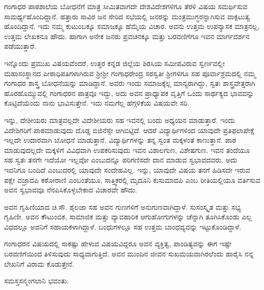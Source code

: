 {ಗಂಗಾಧರ ಪಾಠಶಾಲೆಯ ಬೋಧನೆಗೆ ಮಾತ್ರ ಸೀಮಿತವಾಗದೇ ದೇಶವಿದೇಶ\-ಗಳಿಗೂ ತೆರಳಿ ವಿಷಯ ಸಮರ್ಥಿಸುವ ಸಾಮರ್ಥ್ಯಹೊಂದಿದ್ದಾನೆ. ಹತ್ತಾರು ಸಾವಿರ ಜನ ಸೇರಿದ ಸಭೆಯಲ್ಲಿ ಜನರನ್ನು ಮಂತ್ರಮುಗ್ಧರನ್ನಾಗಿಸುವ ವಾಕ್ಪಟುತ್ವ ಹೊಂದಿದ್ದಾನೆ. ಇದು ನಮ್ಮ ಕುಟುಂಬಕ್ಕೂ ಸಮಾಜಕ್ಕೂ ಹೆಮ್ಮೆಯ ವಿಚಾರ. ಅವನು ಉತ್ತಮ ಉಪ\-ನ್ಯಾಸಕ ಮಾತ್ರನಲ್ಲ, ಉತ್ತಮ ಲೇಖಕನೂ ಹೌದು. ಹಾಗಾಗಿ ಅನೇಕ ಜನರು ಪ್ರವಚನಕ್ಕೂ ಮತ್ತು ಬರವಣಿಗೆಗೂ ಇವನ ಮಾರ್ಗದರ್ಶನ ಪಡೆಯುತ್ತಾರೆ. 

ಇನ್ನೊಂದು ಪ್ರಮುಖ ವಿಷಯವೆಂದರೆ, ಉತ್ತರ ಕನ್ನಡ ಜಿಲ್ಲೆಯ ಶಿರಸಿಯ ಸಮೀಪ\-ವಿರುವ ಸ್ವರ್ಣವಲ್ಲೀ ಮಹಾಸಂಸ್ಥಾನದ ಪೀಠಾಧಿಪತಿಗಳಾಗಿರುವ ಶ್ರೀಶ್ರೀ ಗಂಗಾ\-ಧರೇಂದ್ರ ಸರಸ್ವತೀ ಶ್ರೀಗಳಿಗೂ ಸಹ ಪೂರ್ವಾಶ್ರಮದಲ್ಲಿ ನಮ್ಮ ಗಂಗಾಧರ ಶಾಸ್ತ್ರ ಬೋಧನೆಯನ್ನು  ಮಾಡಿದ್ದಾನೆ. ಅವರು ಇಂದು ಸಮಾಜಕ್ಕೆಲ್ಲ ಮಾನ್ಯರಾಗಿದ್ದು, ಸ್ವತಃ ಶಾಸ್ತ್ರವೇತ್ತರಾಗಿ ಹೊರಹೊಮ್ಮುವಲ್ಲಿ ಗಂಗಾಧರನ ಪಾತ್ರವೂ ಇದ್ದು, ಅದು ಅವನ ಪ್ರಾಧ್ಯಾಪಕ ವೃತ್ತಿಗೆ ಒಂದು ಸಾರ್ಥಕ್ಯದ ಭಾವವನ್ನು ಕೊಟ್ಟಿದೆಯೆಂದು ನಾನು ಭಾವಿಸುತ್ತೇನೆ. ಇದು ನಮಗೆಲ್ಲ ಹೆಗ್ಗಳಿಕೆಯ ವಿಷಯವೇ ಸರಿ. 

ಇನ್ನು, ದೇಶೀಯರು ಮಾತ್ರವಲ್ಲದೇ ವಿದೇಶೀಯರು ಸಹ ಇವನಲ್ಲಿ ಬಂದು ಅಧ್ಯಯನ ಮಾಡುತ್ತಾರೆ. ಇಂದು ವಿದೇಶಿಗರಿಗೆ ಪಾಠಮಾಡುವುದು ದೊಡ್ಡ ಬಿಜಿನೆಸ್ಸೇ ಆಗಿಬಿಟ್ಟಿದೆ. ಆದರೆ ವಿದ್ಯಾರ್ಥಿಗಳಿಂದ ಯಾವುದೇ ಪ್ರತಿಫಲಾಪೇಕ್ಷೆ ಇಲ್ಲದೇ ಉದಾರವಾಗಿ ಬೋಧನೆ ಮಾಡುತ್ತಾನೆ. ವಿದ್ಯಾರ್ಥಿಗಳನ್ನು ತನ್ನ ಸ್ವಂತ ಮಕ್ಕಳಂತೆ ಕಾಣುತ್ತಾನೆ. ಪಾಠ ಮಾಡುವುದಲ್ಲದೇ ಮಕ್ಕಳಿಗೆ ವಿವಿಧವಾಗಿ ಉಪಕರಿಸುವುದು ಇವನ ವಿಶಾಲಗುಣ, ವಿಶೇಷ\-ಗುಣ. ಇವನ ತಂದೆಯೂ ಸಹ ಸ್ವತಃ ತನಗೇ ಇದೆಯೋ ಇಲ್ಲವೋ ಎಂಬುದನ್ನೂ ಪರಿಗಣಿಸದೇ ದಾನ ಮಾಡುವ ಸ್ವಭಾವದವರು. ಅದು ಇವನಿಗೂ ಬಂದಿದೆ ಎಂಬುದರಲ್ಲಿ ಯಾವುದೇ ಸಂದೇಹವಿಲ್ಲ. ಇನ್ನು, ಯಾವುದೇ ವಿಷಯ ತನಗೆ ಹಿಡಿಸದೇ ಇರುವ ಪಕ್ಷೇ ವಜ್ರಾದಪಿ ಕಠೋರಾಣಿ ಎಂಬಂತೆಯೂ, ಸಾತ್ತ್ವಿಕರಲ್ಲಿ ಮೃದೂನಿ ಕುಸುಮಾದಪಿ ಎಂಬ ರೀತಿಯಲ್ಲಿಯೂ ವರ್ತಿಸುವ ಅವನ ಸ್ವಭಾವವೂ ನೆನಪಿಸಿಕೊಳ್ಳಬೇಕಾದ ವಿಚಾರವೇ ಹೌದು.

ಅವನ ಗೃಹಿಣಿಯಾದ ಚಿ.ಸೌ. ಶೈಲಜಾ ಸಹ ಅವನ ಗುಣಗಳಿಗೆ ಅನುಗುಣ\-ವಾಗಿದ್ದಾಳೆ. ಸುಸಂಸ್ಕೃತ ಮತ್ತು ಸಭ್ಯ ಗೃಹಿಣೀ. ಅವನ ಕೌಟುಂಬಿಕ, ಸಾಮಾಜಿಕ ಮತ್ತು ವ್ಯಾವಹಾರಿಕ ಆಗುಹೋಗುಗಳನ್ನು ಚೆನ್ನಾಗಿ ತೂಗಿಸಿಕೊಂಡು ಎಲ್ಲ ವಿಧದಲ್ಲೂ ಅವನಿಗೆ ಸಹಾಯಕಳಾಗಿದ್ದಾಳೆ. ಬಂಧುಗಳಲ್ಲೂ ಸಹ ಉತ್ತಮ ಬಾಂಧವ್ಯವನ್ನು ಇಟ್ಟು\-ಕೊಂಡಿದ್ದಾಳೆ. 

ಗಂಗಾಧರನ ವಿಷಯದಲ್ಲಿ ಸಾಕಷ್ಟು ಹೇಳುವ ವಿಷಯವಿದ್ದರೂ ಅವನ ವ್ಯಕ್ತಿತ್ವ, ಪಾಂಡಿತ್ಯವನ್ನು ಈಗ ಇಷ್ಟೇ ಬರವಣಿಗೆಯಿಂದ ತಿಳಿಸುವುದು ಸಾಧ್ಯವಾಗುತ್ತಿದೆ. ಅವನ ಮುಂದಿನ ಜೀವನ ಸುಖಮಯವಾಗಿರಲೆಂದು ಹಾರೈಸಿ ನನ್ನ ಲೇಖನಿಗೆ ವಿರಾಮ ಕೊಡುತ್ತೇನೆ.

\bigskip

\centerline{ಸಮಸ್ತಸನ್ಮಂಗಲಾನಿ ಭವಂತು.}


\articleend
}
